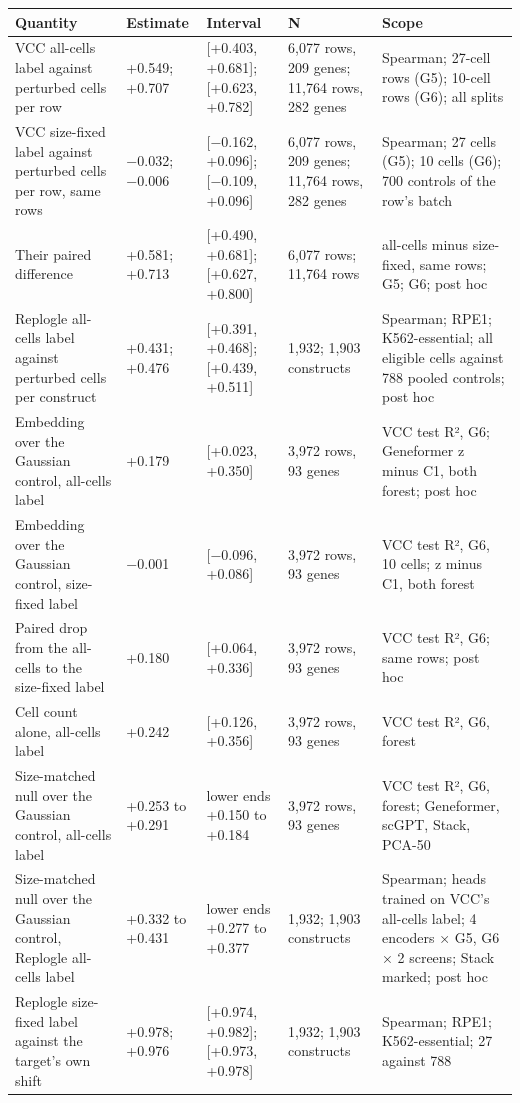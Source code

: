 \begin{tabular}{lllll}
\toprule
Quantity & Estimate & Interval & N & Scope \\
\midrule
VCC all-cells label against perturbed cells per row & +0.549; +0.707 & [+0.403, +0.681]; [+0.623, +0.782] & 6,077 rows, 209 genes; 11,764 rows, 282 genes & Spearman; 27-cell rows (G5); 10-cell rows (G6); all splits \\
VCC size-fixed label against perturbed cells per row, same rows & −0.032; −0.006 & [−0.162, +0.096]; [−0.109, +0.096] & 6,077 rows, 209 genes; 11,764 rows, 282 genes & Spearman; 27 cells (G5); 10 cells (G6); 700 controls of the row's batch \\
Their paired difference & +0.581; +0.713 & [+0.490, +0.681]; [+0.627, +0.800] & 6,077 rows; 11,764 rows & all-cells minus size-fixed, same rows; G5; G6; post hoc \\
Replogle all-cells label against perturbed cells per construct & +0.431; +0.476 & [+0.391, +0.468]; [+0.439, +0.511] & 1,932; 1,903 constructs & Spearman; RPE1; K562-essential; all eligible cells against 788 pooled controls; post hoc \\
Embedding over the Gaussian control, all-cells label & +0.179 & [+0.023, +0.350] & 3,972 rows, 93 genes & VCC test R², G6; Geneformer z minus C1, both forest; post hoc \\
Embedding over the Gaussian control, size-fixed label & −0.001 & [−0.096, +0.086] & 3,972 rows, 93 genes & VCC test R², G6, 10 cells; z minus C1, both forest \\
Paired drop from the all-cells to the size-fixed label & +0.180 & [+0.064, +0.336] & 3,972 rows, 93 genes & VCC test R², G6; same rows; post hoc \\
Cell count alone, all-cells label & +0.242 & [+0.126, +0.356] & 3,972 rows, 93 genes & VCC test R², G6, forest \\
Size-matched null over the Gaussian control, all-cells label & +0.253 to +0.291 & lower ends +0.150 to +0.184 & 3,972 rows, 93 genes & VCC test R², G6, forest; Geneformer, scGPT, Stack, PCA-50 \\
Size-matched null over the Gaussian control, Replogle all-cells label & +0.332 to +0.431 & lower ends +0.277 to +0.377 & 1,932; 1,903 constructs & Spearman; heads trained on VCC's all-cells label; 4 encoders × G5, G6 × 2 screens; Stack marked; post hoc \\
Replogle size-fixed label against the target's own shift & +0.978; +0.976 & [+0.974, +0.982]; [+0.973, +0.978] & 1,932; 1,903 constructs & Spearman; RPE1; K562-essential; 27 against 788 \\

\end{tabular}
